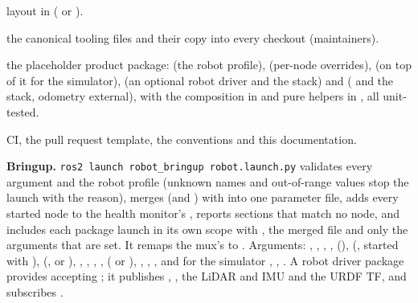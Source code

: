 \begin{description}
    layout in  ( or ).
  \item[\code{scripts/sync_tooling.sh}, \code{tooling/}] the canonical tooling files and their
    copy into every checkout (maintainers).
  \item[\code{src/robot_bringup}] the placeholder product package:  (the
    robot profile),  (per-node overrides),  (on
    top of it for the simulator),  (an optional robot driver and the
    stack) and  ( and the stack, odometry external),
    with the composition in  and pure helpers in
    , all unit-tested.
  \item[\code{.github/}, \code{CONTRIBUTING.md}, \code{docs/}] CI, the pull request template,
    the conventions and this documentation.
\end{description}

\textbf{Bringup.} \texttt{ros2 launch robot\_bringup robot.launch.py} validates every argument
and the robot profile (unknown names and out-of-range values stop the launch with the reason),
merges  (and ) with  into one parameter file,
adds every started node to the health monitor's , reports sections that
match no node, and includes each package launch in its own scope with , the
merged file and only the arguments that are set. It remaps the mux's  to
. Arguments: , ,
, ,  (), 
(, started with ),
 (,  or ), ,
, , , 
( or ), ,
, , and for the simulator , ,
. A robot driver package provides  accepting
; it publishes , , the LiDAR and IMU and
the URDF TF, and subscribes .

